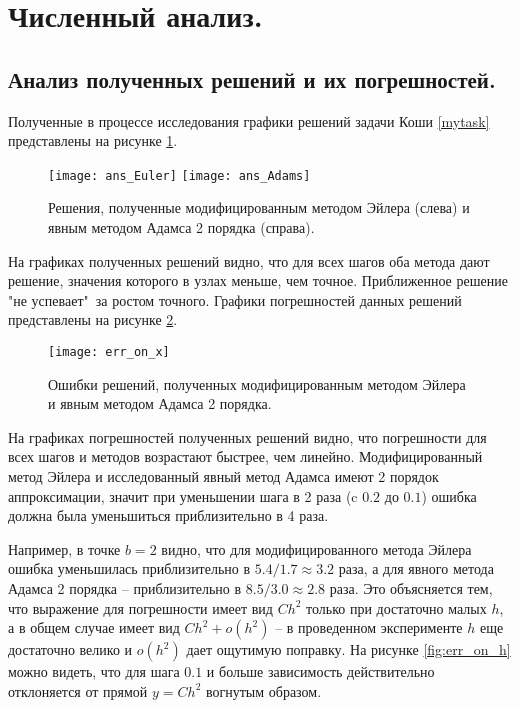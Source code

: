 \documentclass[a4paper, 12pt]{article}
\theoremstyle{mythm}
\begin{document}
	\section{Численный анализ.}
	
	\subsection{Анализ полученных решений и их погрешностей.} \label{analysis:ans}
	
	Полученные в процессе исследования графики решений задачи Коши \eqref{mytask} представлены на рисунке \ref{fig:ans}.
	
	\begin{figure}[H]\centering
		\texttt{[image: ans\_Euler]}
		\texttt{[image: ans\_Adams]}
		\caption{Решения, полученные модифицированным методом Эйлера (слева) и явным методом Адамса 2 порядка (справа).}\label{fig:ans}
	\end{figure}

	На графиках полученных решений видно, что для всех шагов оба метода дают решение, значения которого в узлах меньше, чем точное. Приближенное решение "не успевает"\ за ростом точного. Графики погрешностей данных решений представлены на рисунке \ref{fig:err}.
	
	\begin{figure}[H]\centering
		\texttt{[image: err\_on\_x]}
		\caption{Ошибки решений, полученных модифицированным методом Эйлера и явным методом Адамса 2 порядка.}\label{fig:err}
	\end{figure}

	На графиках погрешностей полученных решений видно, что погрешности для всех шагов и методов возрастают быстрее, чем линейно. Модифицированный метод Эйлера и исследованный явный метод Адамса имеют 2 порядок аппроксимации, значит при уменьшении шага в 2 раза (c $0.2$ до $0.1$) ошибка должна была уменьшиться приблизительно в 4 раза. 
	
	Например, в точке $b=2$ видно, что для модифицированного метода Эйлера ошибка уменьшилась приблизительно в $5.4/1.7\approx3.2$ раза, а для явного метода Адамса 2 порядка -- приблизительно в $8.5/3.0\approx2.8$ раза. Это объясняется тем, что выражение для погрешности имеет вид $Ch^2$ только при достаточно малых $h$, а в общем случае имеет вид $Ch^2 + o(h^2)$ -- в проведенном эксперименте $h$ еще достаточно велико и $o(h^2)$ дает ощутимую поправку. На рисунке \ref{fig:err_on_h} можно видеть, что для шага $0.1$ и больше зависимость действительно отклоняется от прямой $y=Ch^2$ вогнутым образом.
	
\end{document}
